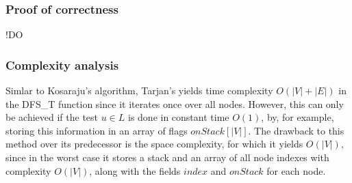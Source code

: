 \subsubsection{Proof of correctness}
!DO 
\subsubsection{Complexity analysis}
Simlar to Kosaraju's algorithm, Tarjan's yields time complexity $O(|V|+|E|)$ in the DFS\_T function since it iterates once over all nodes. However, this can only be achieved if the test $u \in L$ is done in constant time $O(1)$, by, for example, storing this information in an array of flags $onStack[|V|]$.
The drawback to this method over its predecessor is the space complexity, for which it yields $O(|V|)$, since in the worst case it stores a stack and an array of all node indexes with complexity $O(|V|)$, along with the fields $index$ and $onStack$ for each node. 